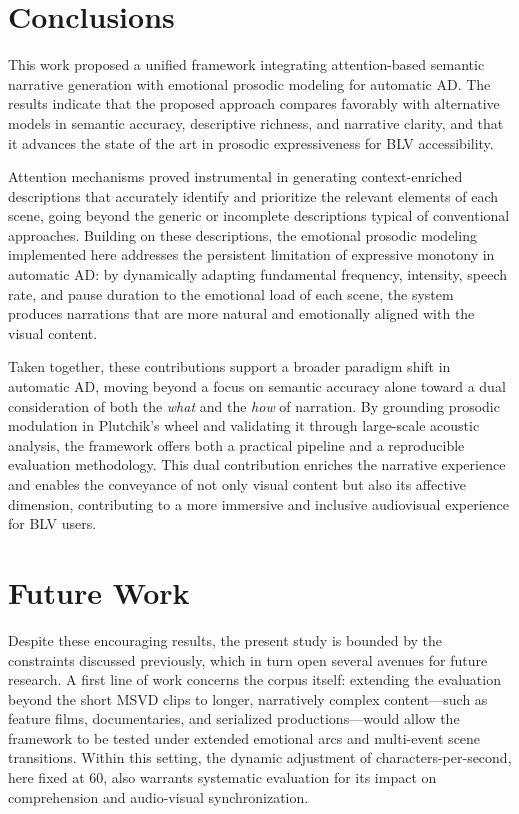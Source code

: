 \documentclass[pdflatex,iicol,sn-mathphys-num]{sn-jnl}%
\theoremstyle{thmstyleone}%
\theoremstyle{thmstyletwo}%
\theoremstyle{thmstylethree}%
\begin{document}
\section{Conclusions}
\label{sec:conclusions}

\noindent This work proposed a unified framework integrating attention-based semantic narrative generation with emotional prosodic modeling for automatic AD. The results indicate that the proposed approach compares favorably with alternative models in semantic accuracy, descriptive richness, and narrative clarity, and that it advances the state of the art in prosodic expressiveness for BLV accessibility.

Attention mechanisms proved instrumental in generating context-enriched descriptions that accurately identify and prioritize the relevant elements of each scene, going beyond the generic or incomplete descriptions typical of conventional approaches. Building on these descriptions, the emotional prosodic modeling implemented here addresses the persistent limitation of expressive monotony in automatic AD: by dynamically adapting fundamental frequency, intensity, speech rate, and pause duration to the emotional load of each scene, the system produces narrations that are more natural and emotionally aligned with the visual content.

Taken together, these contributions support a broader paradigm shift in automatic AD, moving beyond a focus on semantic accuracy alone toward a dual consideration of both the \textit{what} and the \textit{how} of narration. By grounding prosodic modulation in Plutchik's wheel and validating it through large-scale acoustic analysis, the framework offers both a practical pipeline and a reproducible evaluation methodology. This dual contribution enriches the narrative experience and enables the conveyance of not only visual content but also its affective dimension, contributing to a more immersive and inclusive audiovisual experience for BLV users.

\section{Future Work}
\label{sec:future}

\noindent Despite these encouraging results, the present study is bounded by the constraints discussed previously, which in turn open several avenues for future research. A first line of work concerns the corpus itself: extending the evaluation beyond the short MSVD clips to longer, narratively complex content—such as feature films, documentaries, and serialized productions—would allow the framework to be tested under extended emotional arcs and multi-event scene transitions. Within this setting, the dynamic adjustment of characters-per-second, here fixed at 60, also warrants systematic evaluation for its impact on comprehension and audio-visual synchronization.
\end{document}
